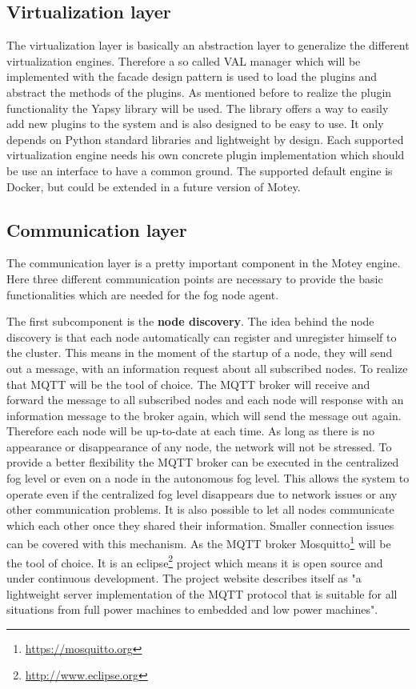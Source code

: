 \subsection{Virtualization layer}
The virtualization layer is basically an abstraction layer to generalize the different virtualization engines.
Therefore a so called \ac{VAL} manager which will be implemented with the facade design pattern is used to load the plugins and abstract the methods of the plugins.
As mentioned before to realize the plugin functionality the Yapsy library will be used.
The library offers a way to easily add new plugins to the system and is also designed to be easy to use.
It only depends on Python standard libraries and lightweight by design.
Each supported virtualization engine needs his own concrete plugin implementation which should be use an interface to have a common ground.
The supported default engine is Docker, but could be extended in a future version of Motey.


\subsection{Communication layer}
\label{subsection:CommunicationLayer}
The communication layer is a pretty important component in the Motey engine.
Here three different communication points are necessary to provide the basic functionalities which are needed for the fog node agent.

The first subcomponent is the \textbf{node discovery}.
The idea behind the node discovery is that each node automatically can register and unregister himself to the cluster.
This means in the moment of the startup of a node, they will send out a message, with an information request about all subscribed nodes.
To realize that \ac{MQTT} will be the tool of choice.
The \ac{MQTT} broker will receive and forward the message to all subscribed nodes and each node will response with an information message to the broker again, which will send the message out again.
Therefore each node will be up-to-date at each time.
As long as there is no appearance or disappearance of any node, the network will not be stressed.
To provide a better flexibility the \ac{MQTT} broker can be executed in the centralized fog level or even on a node in the autonomous fog level.
This allows the system to operate even if the centralized fog level disappears due to network issues or any other communication problems.
It is also possible to let all nodes communicate which each other once they shared their information.
Smaller connection issues can be covered with this mechanism.
As the \ac{MQTT} broker Mosquitto\footnote{\url{https://mosquitto.org}} will be the tool of choice.
It is an eclipse\footnote{\url{http://www.eclipse.org}} project which means it is open source and under continuous development.
The project website describes itself as "a lightweight server implementation of the MQTT protocol that is suitable for all situations from full power machines to embedded and low power machines"\autocite{Eclipse:Mosquitto}.


